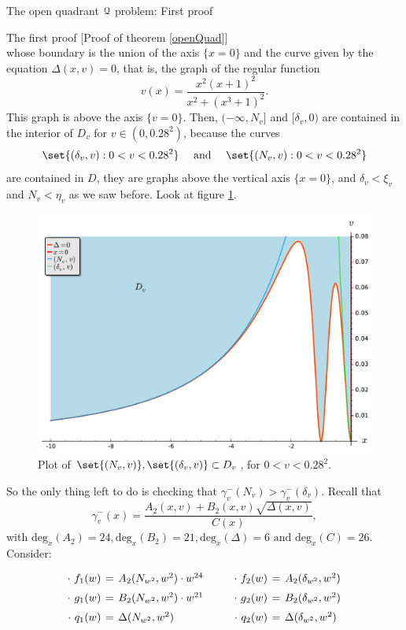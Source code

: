 \documentclass[11pt, a4paper, english, twoside, notitlepage, openright]{report}
\begin{document}
\begin{chapter}{The open quadrant $\mathcal{Q}$ problem: First proof}
\begin{section}{The first proof} [Proof of theorem \ref{openQuad}]
$$$$ 
whose boundary is the union of the axis $\{x=0\}$ and the curve given by the equation $\Delta(x,v)=0$, that is, the graph of the regular function
$$
v(x)=\frac{x^2(x+1)^2}{x^2+(x^3+1)^2}.
$$
This graph is above the axis $\{v=0\}$. Then, $(-\infty,N_v]$ and $[\delta_v,0)$ are contained in the interior of $D_v$ for $v\in (0, 0.28^2)$, because the curves 
$$
\set{(\delta_v,v):0<v<0.28^2} \quad\text{ and }\quad \set{(N_v,v):0<v<0.28^2}
$$ 
are contained in $D$, they are graphs above the vertical axis $\{x=0\}$, and $\delta_v<\xi_v$ and $N_v<\eta_v$ as we saw before. Look at figure \ref{fig:nice_plot}.

\begin{figure}[h]
\centering
\includegraphics[width=1\textwidth]{plots/ch1_15_nice_plot.pdf}
\caption{Plot of $\set{(N_v, v)}, \set{(\delta_v,v)}\subset D_v$, for $0<v<0.28^2$.\label{fig:nice_plot}}
\end{figure}
So the only thing left to do is checking that $\gamma_v^-(N_v)>\gamma_v^-(\delta_v)$. Recall that 
$$
\gamma_v^-(x)=\dfrac{A_2(x,v)+B_2(x,v)\sqrt{\Delta(x,v)}}{C(x)},
$$
with $\text{deg}_x(A_2)=24,\text{deg}_x(B_2)=21, \text{deg}_x(\Delta)=6 \text{ and }\text{deg}_x(C)=26$. Consider:
$$
\arraycolsep=2pt\def\arraystretch{1.5}
\begin{array}{rclcrcl}
\cdot\ f_1(w)&=&A_2(N_{w^2},w^2)\cdot w^{24}& \qquad &\cdot\ f_2(w)&=& A_2(\delta_{w^2},w^2)\\
\cdot\ g_1(w)&=&B_2(N_{w^2},w^2)\cdot w^{21}& \qquad &\cdot\ g_2(w)&=&B_2(\delta_{w^2},w^2)\\
\cdot\ q_1(w)&=&\Delta(N_{w^2},w^2)& \qquad &\cdot\ q_2(w)&=&\Delta(\delta_{w^2},w^2)\\

\end{array}$$
\end{section}
\end{chapter}
\end{document}
